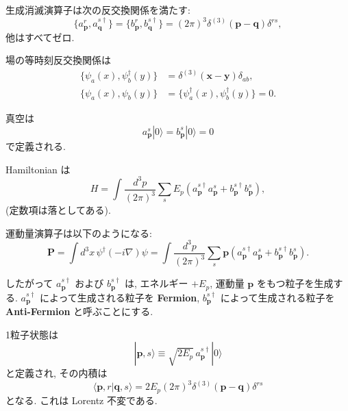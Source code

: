 \documentclass[a4paper,12pt]{article}
\begin{document}
生成消滅演算子は次の反交換関係を満たす:
\begin{equation}
\{a^r_{\mathbf{p}}, a^{s\dagger}_{\mathbf{q}}\} = \{b^r_{\mathbf{p}}, b^{s\dagger}_{\mathbf{q}}\} 
= (2\pi)^3 \delta^{(3)}(\mathbf{p}-\mathbf{q})\delta^{rs},
\tag{3.101}
\end{equation}
他はすべてゼロ.  

場の等時刻反交換関係は
\begin{align}
\{\psi_a(x), \psi_b^\dagger(y)\} &= \delta^{(3)}(\mathbf{x}-\mathbf{y}) \delta_{ab}, \\
\{\psi_a(x), \psi_b(y)\} &= \{\psi_a^\dagger(x), \psi_b^\dagger(y)\} = 0 .
\tag{3.102}
\end{align}

真空は
\begin{equation}
a^s_{\mathbf{p}}|0\rangle = b^s_{\mathbf{p}}|0\rangle = 0
\tag{3.103}
\end{equation}
で定義される.  

Hamiltonian は
\begin{equation}
H = \int \frac{d^3p}{(2\pi)^3} \sum_s E_p \left( a^{s\dagger}_{\mathbf{p}} a^s_{\mathbf{p}} + b^{s\dagger}_{\mathbf{p}} b^s_{\mathbf{p}} \right),
\tag{3.104}
\end{equation}
(定数項は落としてある).  

運動量演算子は以下のようになる:
\begin{equation}
\mathbf{P} = \int d^3x \, \psi^\dagger (-i\nabla) \psi 
= \int \frac{d^3p}{(2\pi)^3} \sum_s \mathbf{p} \left( a^{s\dagger}_{\mathbf{p}} a^s_{\mathbf{p}} + b^{s\dagger}_{\mathbf{p}} b^s_{\mathbf{p}} \right).
\tag{3.105}
\end{equation}

したがって $a^{s\dagger}_{\mathbf{p}}$ および $b^{s\dagger}_{\mathbf{p}}$ は, エネルギー $+E_p$, 運動量 $\mathbf{p}$ をもつ粒子を生成する.  
$a^{s\dagger}_{\mathbf{p}}$ によって生成される粒子を \textbf{Fermion},  
$b^{s\dagger}_{\mathbf{p}}$ によって生成される粒子を \textbf{Anti-Fermion} と呼ぶことにする.  

1粒子状態は
\begin{equation}
|\mathbf{p}, s\rangle \equiv \sqrt{2E_p}\, a^{s\dagger}_{\mathbf{p}}|0\rangle
\tag{3.106}
\end{equation}
と定義され, その内積は
\begin{equation}
\langle \mathbf{p}, r|\mathbf{q}, s\rangle = 2E_p (2\pi)^3 \delta^{(3)}(\mathbf{p}-\mathbf{q})\delta^{rs}
\tag{3.107}
\end{equation}
となる. これは Lorentz 不変である.  
\end{document}
